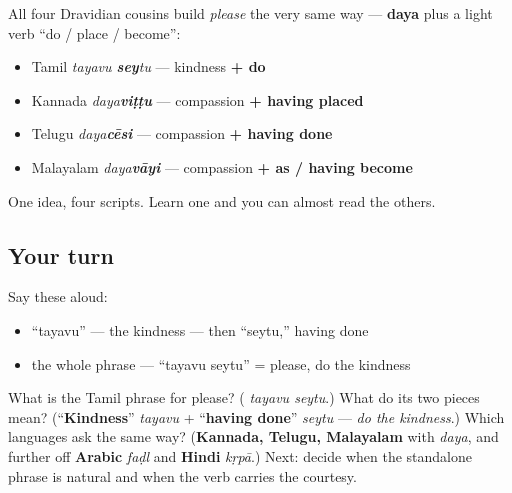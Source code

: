\begin{cousinweb}
All four Dravidian cousins build \emph{please} the very same way — \textbf{daya} plus a light verb \textquotedblleft{}do / place / become\textquotedblright{}:

\begin{itemize}
\raggedright
  \item Tamil \textbf{} \emph{tayavu \textbf{sey}tu} — kindness \textbf{+ do}
  \item Kannada \textbf{} \emph{daya\textbf{viṭṭu}} — compassion \textbf{+ having placed}
  \item Telugu \textbf{} \emph{daya\textbf{cēsi}} — compassion \textbf{+ having done}
  \item Malayalam \textbf{} \emph{daya\textbf{vāyi}} — compassion \textbf{+ as / having become}
\end{itemize}

One idea, four scripts. Learn one and you can almost read the others.
\end{cousinweb}

\subsection*{Your turn}
Say these aloud:

\begin{itemize}
\raggedright
  \item \textquotedblleft{}tayavu\textquotedblright{} — the kindness — then \textquotedblleft{}seytu,\textquotedblright{} having done
  \item the whole phrase — \textquotedblleft{}tayavu seytu\textquotedblright{} = please, do the kindness
\end{itemize}

\begin{tcolorbox}[breakable,colback=teal!4,colframe=teal!35!black,title={Before you move on}]
What is the Tamil phrase for please? (\textbf{} \emph{tayavu seytu}.) What do its two pieces mean? (\textquotedblleft{}\textbf{Kindness}\textquotedblright{} \emph{tayavu} + \textquotedblleft{}\textbf{having done}\textquotedblright{} \emph{seytu} — \emph{do the kindness}.) Which languages ask the same way? (\textbf{Kannada, Telugu, Malayalam} with \emph{daya}, and further off \textbf{Arabic} \emph{faḍl} and \textbf{Hindi} \emph{kṛpā}.) Next: decide when the standalone phrase is natural and when the verb carries the courtesy.
\end{tcolorbox}
